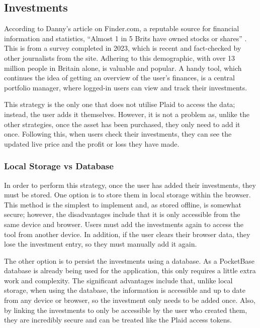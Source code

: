 \subsection{Investments}
\label{ssec:investments}
According to Danny's article on Finder.com, a reputable source for financial information and statistics, ``Almost 1 in 5 Brits have owned stocks or shares'' \cite{InvestmentStats}. This is from a survey completed in 2023, which is recent and fact-checked by other journalists from the site. Adhering to this demographic, with over 13 million people in Britain alone, is valuable and popular. A handy tool, which continues the idea of getting an overview of the user's finances, is a central portfolio manager, where logged-in users can view and track their investments.

This strategy is the only one that does not utilise Plaid to access the data; instead, the user adds it themselves. However, it is not a problem as, unlike the other strategies, once the asset has been purchased, they only need to add it once. Following this, when users check their investments, they can see the updated live price and the profit or loss they have made.

\subsubsection{Local Storage vs Database}
In order to perform this strategy, once the user has added their investments, they must be stored. One option is to store them in local storage within the browser. This method is the simplest to implement and, as stored offline, is somewhat secure; however, the disadvantages include that it is only accessible from the same device and browser. Users must add the investments again to access the tool from another device. In addition, if the user clears their browser data, they lose the investment entry, so they must manually add it again.

The other option is to persist the investments using a database. As a PocketBase database is already being used for the application, this only requires a little extra work and complexity. The significant advantages include that, unlike local storage, when using the database, the information is accessible and up to date from any device or browser, so the investment only needs to be added once. Also, by linking the investments to only be accessible by the user who created them, they are incredibly secure and can be treated like the Plaid access tokens.

